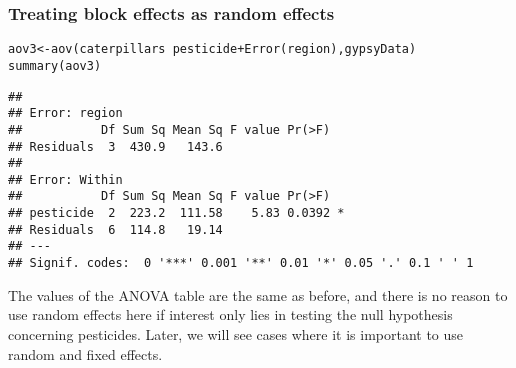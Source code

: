 \documentclass[color=usenames,dvipsnames]{beamer}\usepackage[]{graphicx}\usepackage[]{color}
\makeatletter
\newcommand{\hlopt}[1]{\textcolor[rgb]{0,0,0}{#1}}%
\newcommand{\hlstd}[1]{\textcolor[rgb]{0,0,0}{#1}}%
\newcommand{\hlkwb}[1]{\textcolor[rgb]{0,0.341,0.682}{#1}}%
\newcommand{\hlkwd}[1]{\textcolor[rgb]{0.004,0.004,0.506}{#1}}%
\newenvironment{kframe}{%
 \def\at@end@of@kframe{}%
 \ifinner\ifhmode%
  \def\at@end@of@kframe{\end{minipage}}%
  \begin{minipage}{\columnwidth}%
 \fi\fi%
 \def\FrameCommand##1{\hskip\@totalleftmargin \hskip-\fboxsep
 \colorbox{shadecolor}{##1}\hskip-\fboxsep
     \hskip-\linewidth \hskip-\@totalleftmargin \hskip\columnwidth}%
 \MakeFramed {\advance\hsize-\width
   \@totalleftmargin\z@ \linewidth\hsize
   \@setminipage}}%
 {\par\unskip\endMakeFramed%
 \at@end@of@kframe}
\newenvironment{knitrout}{}{} %
\makeatother
\begin{document}
\begin{frame}[fragile]
  \frametitle{Treating block effects as random effects}
  \footnotesize
\begin{knitrout}
\color{fgcolor}\begin{kframe}
\begin{alltt}
\hlstd{aov3} \hlkwb{<-} \hlkwd{aov}\hlstd{(caterpillars} \hlopt{~} \hlstd{pesticide} \hlopt{+} \hlkwd{Error}\hlstd{(region), gypsyData)}
\hlkwd{summary}\hlstd{(aov3)}
\end{alltt}
\begin{verbatim}
## 
## Error: region
##           Df Sum Sq Mean Sq F value Pr(>F)
## Residuals  3  430.9   143.6               
## 
## Error: Within
##           Df Sum Sq Mean Sq F value Pr(>F)  
## pesticide  2  223.2  111.58    5.83 0.0392 *
## Residuals  6  114.8   19.14                 
## ---
## Signif. codes:  0 '***' 0.001 '**' 0.01 '*' 0.05 '.' 0.1 ' ' 1
\end{verbatim}
\end{kframe}
\end{knitrout}
\pause
\vfill
The values of the ANOVA table are the same as before, and there is
no reason to use random effects here if interest only lies in
testing the null hypothesis concerning pesticides. Later, we will see
cases where it is important to use random and fixed effects.
\end{frame}
\end{document}
